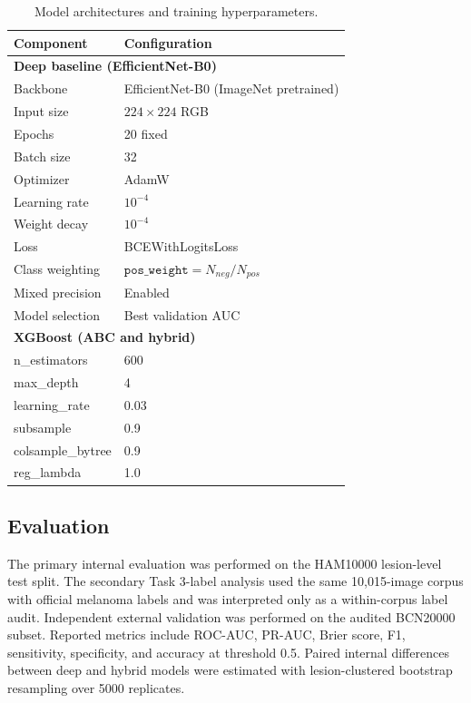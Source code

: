 \documentclass[preprint,12pt]{elsarticle}
\begin{document}
\begin{table}[htbp]
\centering
\caption{Model architectures and training hyperparameters.}
\label{tab:model_params}
\begin{tabular}{ll}
\toprule
Component & Configuration \\
\midrule
\multicolumn{2}{l}{\textbf{Deep baseline (EfficientNet-B0)}} \\
Backbone & EfficientNet-B0 (ImageNet pretrained) \\
Input size & $224 \times 224$ RGB \\
Epochs & 20 fixed \\
Batch size & 32 \\
Optimizer & AdamW \\
Learning rate & $10^{-4}$ \\
Weight decay & $10^{-4}$ \\
Loss & BCEWithLogitsLoss \\
Class weighting & $\texttt{pos\_weight} = N_{neg}/N_{pos}$ \\
Mixed precision & Enabled \\
Model selection & Best validation AUC \\
\midrule
\multicolumn{2}{l}{\textbf{XGBoost (ABC and hybrid)}} \\
n\_estimators & 600 \\
max\_depth & 4 \\
learning\_rate & 0.03 \\
subsample & 0.9 \\
colsample\_bytree & 0.9 \\
reg\_lambda & 1.0 \\
\bottomrule
\end{tabular}
\end{table}

\subsection{Evaluation}

The primary internal evaluation was performed on the HAM10000 lesion-level test split. The secondary Task 3-label analysis used the same 10,015-image corpus with official melanoma labels and was interpreted only as a within-corpus label audit. Independent external validation was performed on the audited BCN20000 subset. Reported metrics include ROC-AUC, PR-AUC, Brier score, F1, sensitivity, specificity, and accuracy at threshold 0.5. Paired internal differences between deep and hybrid models were estimated with lesion-clustered bootstrap resampling over 5000 replicates.
\end{document}

